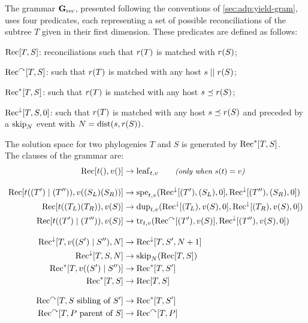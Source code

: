 The grammar \(\mathbf{G}_{\mathrm{rec}}\), presented following the conventions of \cref{sec:adp:yield-gram}, uses four predicates, each representing a set of possible reconciliations of the subtree \(T\) given in their first dimension.
These predicates are defined as follows:
\begin{compactitemize}
    \item \(\mathrm{Rec}[T, S]\): reconciliations such that \(r(T)\) is matched with \(r(S)\);
    \item \(\mathrm{Rec}^{\curvearrowright}[T, S]\): such that \(r(T)\) is matched with any host \(s \mathrel{||} r(S)\);
    \item \(\mathrm{Rec}^{\ast}[T, S]\): such that \(r(T)\) is matched with any host \(s \preceq r(S)\);
    \item \(\mathrm{Rec}^{\downarrow}[T, S, 0]\): such that \(r(T)\) is matched with any host \(s \preceq r(S)\) and preceded by a \(\mathrm{skip}_N\) event with \(N = \mathrm{dist}(s, r(S))\).
\end{compactitemize}
The solution space for two phylogenies \(T\) and \(S\) is generated by \(\mathrm{Rec}^{\ast}[T, S]\).\\
The clauses of the grammar are:
{\allowdisplaybreaks
\begin{subequations}
\begin{align}
    \mathrm{Rec}[t(), v()] &\rightarrow \mathrm{leaf}_{t,v}
    \qquad\text{\itshape\small (only when \(s(t) = v\))} \label{eq:adp-rec:bilateral-grammar-leaf}\\[2ex]
    \mathrm{Rec}[t((T') \mid (T'')), v((S_L)(S_R))] &\rightarrow
        \mathrm{spe}_{t,v}(\mathrm{Rec}^{\downarrow}[(T'), (S_L), 0], \mathrm{Rec}^{\downarrow}[(T''), (S_R), 0]) \label{eq:adp-rec:bilateral-grammar-spe} \\
    \mathrm{Rec}[t((T_L)(T_R)), v(S)] &\rightarrow
        \mathrm{dup}_{t,v}(\mathrm{Rec}^{\downarrow}[(T_L), v(S), 0], \mathrm{Rec}^{\downarrow}[(T_R), v(S), 0]) \label{eq:adp-rec:bilateral-grammar-dup} \\
    \mathrm{Rec}[t((T') \mid (T'')), v(S)] &\rightarrow
        \mathrm{tr}_{t,v}(\mathrm{Rec}^{\curvearrowright}[(T'), v(S)], \mathrm{Rec}^{\downarrow}[(T''), v(S), 0]) \label{eq:adp-rec:bilateral-grammar-tr} \\[2ex]
    \mathrm{Rec}^{\downarrow}[T, v((S') \mid S''), N] &\rightarrow \mathrm{Rec}^{\downarrow}[T, S', N+1] \label{eq:adp-rec:bilateral-grammar-path-down}\\
    \mathrm{Rec}^{\downarrow}[T, S, N] &\rightarrow \mathrm{skip}_N(\mathrm{Rec}[T, S]) \label{eq:adp-rec:bilateral-grammar-path-end}\\
    \mathrm{Rec}^{\ast}[T, v((S') \mid S'')] &\rightarrow \mathrm{Rec}^{\ast}[T, S'] \label{eq:adp-rec:bilateral-grammar-in-down}\\
    \mathrm{Rec}^{\ast}[T, S] &\rightarrow \mathrm{Rec}[T, S] \label{eq:adp-rec:bilateral-grammar-in-end}\\[2ex]
    \mathrm{Rec}^{\curvearrowright}[T, S \text{ sibling of } S'] &\rightarrow
        \mathrm{Rec}^{\ast}[T, S'] \label{eq:adp-rec:bilateral-grammar-out-side}\\
    \mathrm{Rec}^{\curvearrowright}[T, P \text{ parent of } S] &\rightarrow
        \mathrm{Rec}^{\curvearrowright}[T, P] \label{eq:adp-rec:bilateral-grammar-out-up}
\end{align}
\end{subequations}}%
